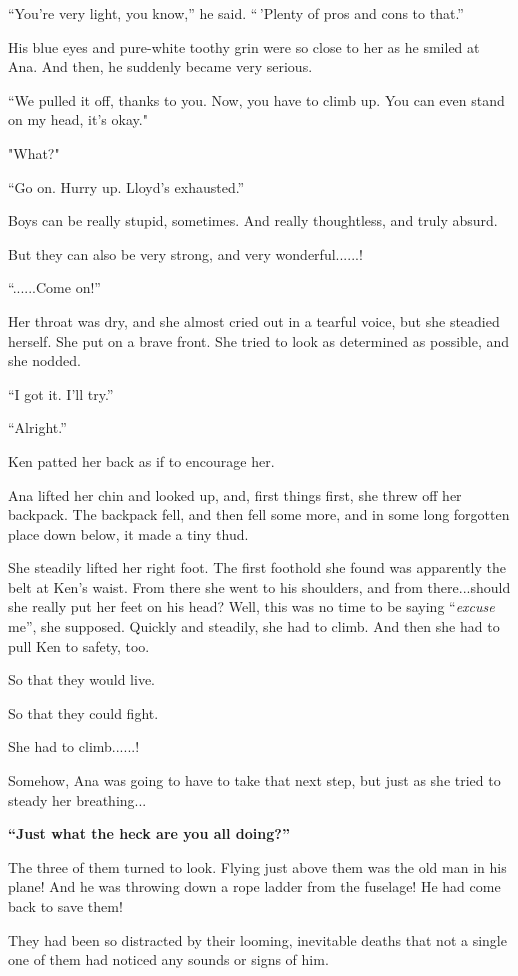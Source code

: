 \documentclass[
]{article}
\begin{document}
``You're very light, you know,'' he said. ``\,'Plenty of pros and cons
to that.''

His blue eyes and pure-white toothy grin were so close to her as he
smiled at Ana. And then, he suddenly became very serious.

``We pulled it off, thanks to you. Now, you have to climb up. You can
even stand on my head, it's okay."

"What?"

``Go on. Hurry up. Lloyd's exhausted.''

Boys can be really stupid, sometimes. And really thoughtless, and truly
absurd.

But they can also be very strong, and very wonderful......!

``......Come on!''

Her throat was dry, and she almost cried out in a tearful voice, but she
steadied herself. She put on a brave front. She tried to look as
determined as possible, and she nodded.

``I got it. I'll try.''

``Alright.''

Ken patted her back as if to encourage her.

Ana lifted her chin and looked up, and, first things first, she threw
off her backpack. The backpack fell, and then fell some more, and in
some long forgotten place down below, it made a tiny thud.

She steadily lifted her right foot. The first foothold she found was
apparently the belt at Ken's waist. From there she went to his
shoulders, and from there...should she really put her feet on his head?
Well, this was no time to be saying ``\emph{excuse }me'', she supposed.
Quickly and steadily, she had to climb. And then she had to pull Ken to
safety, too.

So that they would live.

So that they could fight.

She had to climb......!

Somehow, Ana was going to have to take that next step, but just as she
tried to steady her breathing...

\textbf{``Just what the heck are you all doing?''}

The three of them turned to look. Flying just above them was the old man
in his plane! And he was throwing down a rope ladder from the fuselage!
He had come back to save them!

They had been so distracted by their looming, inevitable deaths that not
a single one of them had noticed any sounds or signs of him.
\end{document}
